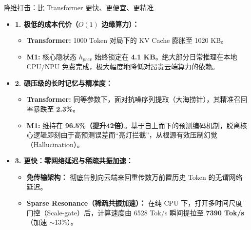 ﻿\documentclass[aspectratio=169, 10pt]{beamer}
\begin{document}
\begin{frame}{降维打击：比 Transformer 更快、更便宜、更精准}
\begin{itemize}
    \item \textbf{1. 极低的成本代价（$O(1)$ 边缘算力）：}
    \begin{itemize}
        \item \textbf{Transformer:} 1000 Token 对局下的 KV Cache 膨胀至 1020 KB。
        \item \textbf{M1:} 核心隐状态 $h_{prev}$ 始终锁定在 \textbf{4.1 KB}。绝大部分日常推理在本地 CPU/NPU 免费完成，极大幅度地降低对昂贵云端算力的依赖。
    \end{itemize}
    \vspace{0.5em}
    \item \textbf{2. 碾压级的长时记忆与精准度：}
    \begin{itemize}
        \item \textbf{Transformer:} 同等参数下，面对抗噪序列提取（大海捞针），其精准召回率暴跌至 \textbf{2.3\%}。
        \item \textbf{M1:} 维持在 \textbf{96.5\%（提升42倍）}。基于自上而下的预测编码机制，脱离核心逻辑即刻由于高预测误差而“亮灯拦截”，从根源有效压制幻觉（Hallucination）。
    \end{itemize}
    \vspace{0.5em}
    \item \textbf{3. 更快：零网络延迟与稀疏共振加速：}
    \begin{itemize}
        \item \textbf{免传输架构：} 彻底告别向云端来回重传数万前置历史 Token 的无谓网络延迟。
        \item \textbf{Sparse Resonance（稀疏共振加速）：} 在纯 CPU 下，打开多时间尺度门控（Scale-gate）后，计算速度由 6528 Tok/s 瞬间提拉至 \textbf{7390 Tok/s}（加速 $\sim$13\%）。
    \end{itemize}
\end{itemize}
\end{frame}
\end{document}
